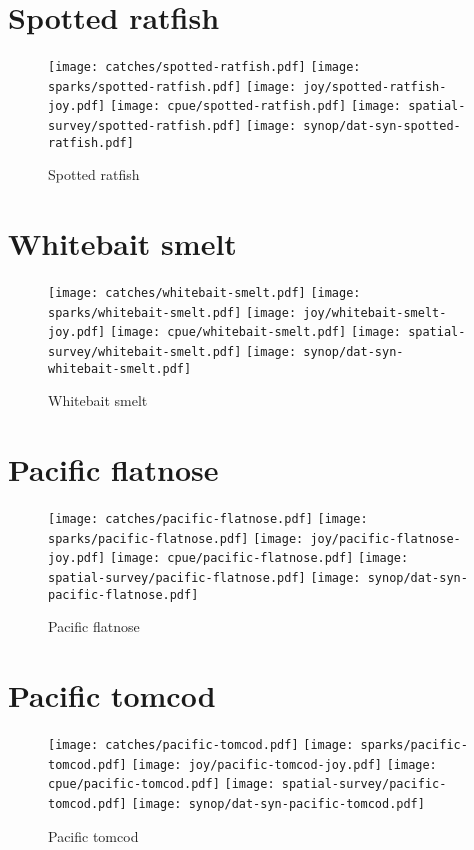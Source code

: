 \section*{Spotted ratfish}

\begin{figure}[htbp]
\centering
\texttt{[image: catches/spotted-ratfish.pdf]}
\texttt{[image: sparks/spotted-ratfish.pdf]}
\texttt{[image: joy/spotted-ratfish-joy.pdf]}
\texttt{[image: cpue/spotted-ratfish.pdf]}
\texttt{[image: spatial-survey/spotted-ratfish.pdf]}
\texttt{[image: synop/dat-syn-spotted-ratfish.pdf]}
\caption{Spotted ratfish}
\end{figure}
\clearpage
\section*{Whitebait smelt}

\begin{figure}[htbp]
\centering
\texttt{[image: catches/whitebait-smelt.pdf]}
\texttt{[image: sparks/whitebait-smelt.pdf]}
\texttt{[image: joy/whitebait-smelt-joy.pdf]}
\texttt{[image: cpue/whitebait-smelt.pdf]}
\texttt{[image: spatial-survey/whitebait-smelt.pdf]}
\texttt{[image: synop/dat-syn-whitebait-smelt.pdf]}
\caption{Whitebait smelt}
\end{figure}
\clearpage
\section*{Pacific flatnose}

\begin{figure}[htbp]
\centering
\texttt{[image: catches/pacific-flatnose.pdf]}
\texttt{[image: sparks/pacific-flatnose.pdf]}
\texttt{[image: joy/pacific-flatnose-joy.pdf]}
\texttt{[image: cpue/pacific-flatnose.pdf]}
\texttt{[image: spatial-survey/pacific-flatnose.pdf]}
\texttt{[image: synop/dat-syn-pacific-flatnose.pdf]}
\caption{Pacific flatnose}
\end{figure}
\clearpage
\section*{Pacific tomcod}

\begin{figure}[htbp]
\centering
\texttt{[image: catches/pacific-tomcod.pdf]}
\texttt{[image: sparks/pacific-tomcod.pdf]}
\texttt{[image: joy/pacific-tomcod-joy.pdf]}
\texttt{[image: cpue/pacific-tomcod.pdf]}
\texttt{[image: spatial-survey/pacific-tomcod.pdf]}
\texttt{[image: synop/dat-syn-pacific-tomcod.pdf]}
\caption{Pacific tomcod}
\end{figure}
\clearpage
